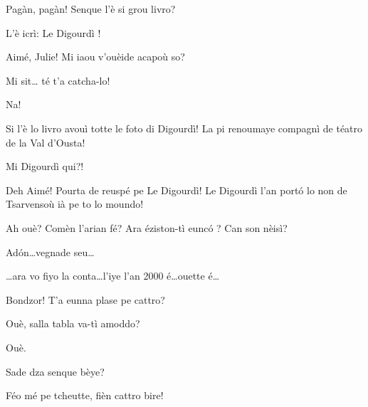\begin{drama}
\Ledouspeaks Pagàn, pagàn! Senque l'è si grou livro?

\Nevaousaspeaks L'è icrì: \og Le Digourdì \fg{}!

\Paganspeaks Aimé, Julie! Mi iaou v'ouèide acapoù so?  


\Paganspeaks{} Mi sit\ldots {} té t'a catcha-lo!

\Maganspeaks Na!

\Paganspeaks Si l'è lo livro avouì totte le foto di Digourdì! La pi renoumaye compagnì de téatro de la Val d’Ousta!

\Nevaouspeaks Mi Digourdì qui?!

\Paganspeaks Deh Aimé! Pourta de reuspé pe Le Digourdì! Le Digourdì l'an port\'o lo non de Tsarvensoù ià pe to lo moundo!

\Nevaousaspeaks Ah ouè? Comèn l'arian fé? Ara éziston-tì eunc\'o ? Can son nèisì?

\Paganspeaks{} Ad\'on\ldots vegnade seu\ldots


\Paganspeaks \ldots ara vo fiyo la conta\ldots l'iye l'an 2000 é\ldots ouette é\ldots




\Francescaspeaks{} Bondzor! T'a eunna plase pe cattro?

\Serventaspeaks Ouè, salla tabla  va-tì amoddo?

\Francescaspeaks Ouè.


\Serventaspeaks Sade dza senque bèye?

\Pierrespeaks Féo mé pe tcheutte, fièn cattro bire!


\end{drama}
